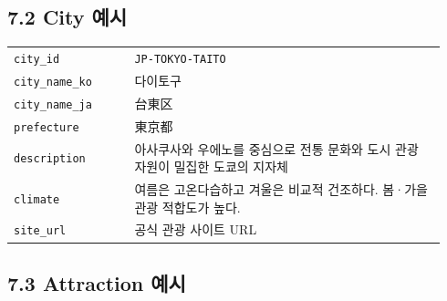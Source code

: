 \documentclass[12pt,a4paper]{article}
\newcommand{\DocNeedspace}[1]{\par\ifdim\dimexpr\pagegoal-\pagetotal\relax<#1\newpage\fi}
\begin{document}
\DocNeedspace{24\baselineskip}
\subsection*{7.2 City 예시}


\DocNeedspace{20\baselineskip}
\begin{small}
\begin{longtable}{@{}>{\RaggedRight\arraybackslash}m{0.265\linewidth}>{\RaggedRight\arraybackslash}m{0.675\linewidth}@{}}
\toprule
\multicolumn{1}{>{\centering\arraybackslash}m{0.265\linewidth}}{\textbf{필드}} & \multicolumn{1}{>{\centering\arraybackslash}m{0.675\linewidth}}{\textbf{예시}} \\
\midrule
\endhead
\texttt{city\_\allowbreak{}id} & \texttt{JP-\allowbreak{}TOKYO-\allowbreak{}TAITO} \\
\texttt{city\_\allowbreak{}name\_\allowbreak{}ko} & 다이토구 \\
\texttt{city\_\allowbreak{}name\_\allowbreak{}ja} & {\jpfont 台東区} \\
\texttt{prefecture} & {\jpfont 東京都} \\
\texttt{description} & 아사쿠사와 우에노를 중심으로 전통 문화와 도시 관광 자원이 밀집한 도쿄의 지자체 \\
\texttt{climate} & 여름은 고온다습하고 겨울은 비교적 건조하다. 봄·가을 관광 적합도가 높다. \\
\texttt{site\_\allowbreak{}url} & 공식 관광 사이트 URL \\
\bottomrule
\end{longtable}
\end{small}


\DocNeedspace{24\baselineskip}
\subsection*{7.3 Attraction 예시}
\end{document}
